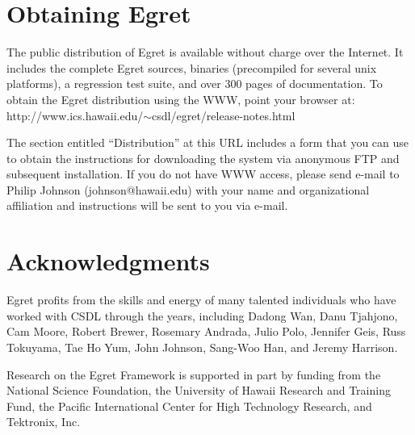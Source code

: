 \section{Obtaining Egret}

The public distribution of Egret is available without charge over the
Internet.  It includes the complete Egret sources, binaries (precompiled
for several unix platforms), a regression test suite, and over 300 pages of
documentation.  To obtain the Egret distribution using the WWW, point
your browser at: \newline
\small
http://www.ics.hawaii.edu/$\sim$csdl/egret/release-notes.html
\normalsize

The section entitled ``Distribution'' at this URL includes a form that you
can use to obtain the instructions for downloading the system via anonymous
FTP and subsequent installation.  If you do not have WWW access, please
send e-mail to Philip Johnson (johnson@hawaii.edu) with your name and
organizational affiliation and instructions will be sent to you via e-mail.

\section{Acknowledgments}

Egret profits from the skills and energy of many talented individuals who
have worked with CSDL through the years, including Dadong Wan, Danu
Tjahjono, Cam Moore, Robert Brewer, Rosemary Andrada, Julio Polo, Jennifer
Geis, Russ Tokuyama, Tae Ho Yum, John Johnson, Sang-Woo Han, and Jeremy
Harrison.

Research on the Egret Framework is supported in part by funding from the
National Science Foundation, the University of Hawaii Research and Training
Fund, the Pacific International Center for High Technology Research, and
Tektronix, Inc.







